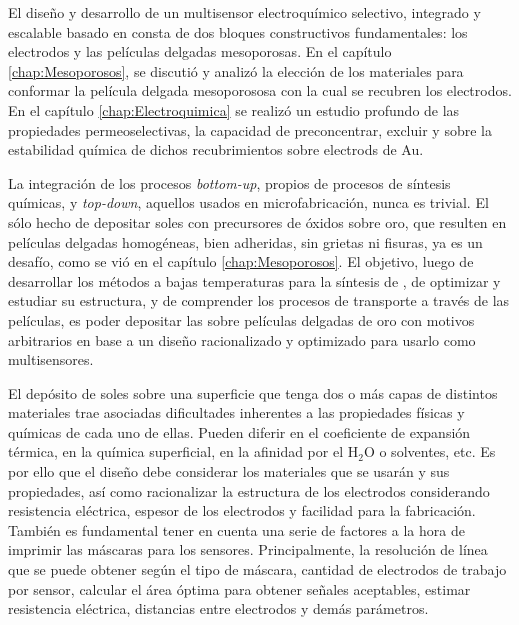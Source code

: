 	El diseño y desarrollo de un multisensor electroquímico selectivo, integrado y escalable basado en \pdm\space consta de dos bloques constructivos fundamentales: los electrodos y las películas delgadas mesoporosas. En el capítulo \ref{chap:Mesoporosos}, se discutió y analizó la elección de los materiales para conformar la película delgada mesoporososa con la cual se recubren los electrodos. En el capítulo \ref{chap:Electroquimica} se realizó un estudio profundo de las propiedades permeoselectivas, la capacidad de preconcentrar, excluir y sobre la estabilidad química de dichos recubrimientos sobre electrods de Au.

	La integración de los procesos \textit{bottom-up}, propios de procesos de síntesis químicas, y \textit{top-down}, aquellos usados en microfabricación, nunca es trivial. El sólo hecho de depositar soles con precursores de óxidos sobre oro, que resulten en películas delgadas homogéneas, bien adheridas, sin grietas ni fisuras, ya es un desafío, como se vió en el capítulo \ref{chap:Mesoporosos}. El objetivo, luego de desarrollar los métodos a bajas temperaturas para la síntesis de \pdm, de optimizar y estudiar su estructura, y de comprender los procesos de transporte a través de las películas, es poder depositar las \pdm\space sobre películas delgadas de oro con motivos arbitrarios en base a un diseño racionalizado y optimizado para usarlo como multisensores. 

	El depósito de soles sobre una superficie que tenga dos o más capas de distintos  materiales trae asociadas dificultades inherentes a las propiedades físicas y químicas de cada uno de ellas. Pueden diferir en el coeficiente de expansión térmica, en la química superficial, en la afinidad por el H$_2$O o solventes, etc.
	Es por ello que el diseño debe considerar los materiales que se usarán y sus propiedades, así como racionalizar la estructura de los electrodos considerando resistencia eléctrica, espesor de los electrodos y facilidad para la fabricación. También es fundamental tener en cuenta una serie de factores a la hora de imprimir las máscaras para los sensores. Principalmente, la resolución de línea que se puede obtener según el tipo de máscara, cantidad de electrodos de trabajo por sensor, calcular el área óptima para obtener señales aceptables, estimar resistencia eléctrica, distancias entre electrodos y demás parámetros.

